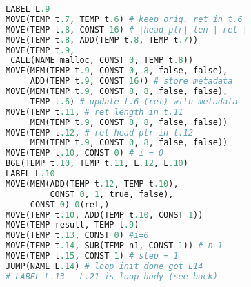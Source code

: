 \begin{minipage}{.6\linewidth}
\begin{lstlisting}[language=Python,frame=none,xleftmargin=-1em]
LABEL L.9
MOVE(TEMP t.7, TEMP t.6) # keep orig. ret in t.6
MOVE(TEMP t.8, CONST 16) # |head ptr| len | ret |
MOVE(TEMP t.8, ADD(TEMP t.8, TEMP t.7))
MOVE(TEMP t.9,
 CALL(NAME malloc, CONST 0, TEMP t.8))
MOVE(MEM(TEMP t.9, CONST 0, 8, false, false),
     ADD(TEMP t.9, CONST 16)) # store metadata
MOVE(MEM(TEMP t.9, CONST 8, 8, false, false),
     TEMP t.6) # update t.6 (ret) with metadata
MOVE(TEMP t.11, # ret length in t.11
     MEM(TEMP t.9, CONST 8, 8, false, false))
MOVE(TEMP t.12, # ret head ptr in t.12
     MEM(TEMP t.9, CONST 0, 8, false, false))
MOVE(TEMP t.10, CONST 0) # i = 0
BGE(TEMP t.10, TEMP t.11, L.12, L.10)
LABEL L.10
MOVE(MEM(ADD(TEMP t.12, TEMP t.10),
         CONST 0, 1, true, false),
     CONST 0) 0(ret,)
MOVE(TEMP t.10, ADD(TEMP t.10, CONST 1))
MOVE(TEMP result, TEMP t.9)
MOVE(TEMP t.13, CONST 0) #i=0
MOVE(TEMP t.14, SUB(TEMP n1, CONST 1)) # n-1
MOVE(TEMP t.15, CONST 1) # step = 1
JUMP(NAME L.14) # loop init done got L14
# LABEL L.13 - L.21 is loop body (see back)
\end{lstlisting}
\end{minipage}
